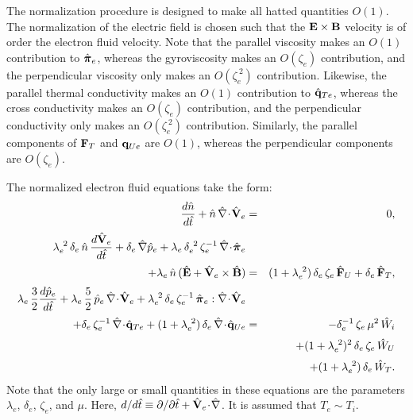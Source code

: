 The normalization procedure is designed to make all hatted quantities $O(1)$.
The normalization of the electric field is chosen 
 such that the ${\bf E}\times{\bf B}$
velocity is of order the electron fluid velocity. Note that the parallel viscosity
makes an $O(1)$ contribution to $\hat{\mbox{\boldmath$\pi$}}_e$, whereas the gyroviscosity
makes an $O(\zeta_e)$ contribution, and the perpendicular viscosity only 
makes an $O(\zeta_e^{~2})$ contribution. Likewise, the parallel thermal
conductivity 
makes an $O(1)$ contribution to $\hat{\bf q}_{Te}$, whereas the cross
conductivity 
makes an $O(\zeta_e)$ contribution, and the perpendicular conductivity only 
makes an $O(\zeta_e^{~2})$ contribution. Similarly, the parallel components
of ${\bf F}_T$ and ${\bf q}_{Ue}$ are $O(1)$, whereas the perpendicular
components are $O(\zeta_e)$. 

The normalized electron fluid equations take the form:
\begin{eqnarray}
\frac{d\hat{n}}{d\hat{t}} + \hat{n}\,\hat{\nabla}\!\cdot\!\hat{\bf V}_e &=&0,\label{e3.113a}\\[0.5ex]
\lambda_e^{~2}\,\delta_e\,\hat{n}\,\frac{d\hat{\bf V}_e}{d\hat{t}} + \delta_e\,
\hat{\nabla}\hat{p}_e + \lambda_e\,\delta_e^{~2}\,\zeta_e^{-1}\,\hat{\nabla}
\!\cdot\!\hat{\bpi}_e  \\[0.5ex]
+ \lambda_e\,\hat{n}\,(\hat{\bf E} + \hat{\bf V}_e
\times\hat{\bf B}) &=& (1+\lambda_e^{~2})\,\delta_e\,\zeta_e\,\hat{\bf F}_U + \delta_e
\,\hat{\bf F}_T, \nonumber\\[0.5ex]
\lambda_e\,\frac{3}{2}\frac{d\hat{p}_e}{d\hat{t}} + \lambda_e\,\frac{5}{2}\,
\hat{p}_e\,\hat{\nabla}\!\cdot\!\hat{\bf V}_e + \lambda_e^{~2}\,\delta_e\,
\zeta_e^{-1}\,\hat{\bpi}_e : \hat{\nabla}\!\cdot\!\hat{\bf V}_e&&\label{e3.113c}\\[0.5ex] 
+\delta_e\,\zeta_e^{-1} \,\hat{\nabla}\!\cdot\!\hat{\bf q}_{Te}
 +(1+\lambda_e^{~2})\,\delta_e\,\hat{\nabla}\!\cdot\!\hat{\bf q}_{Ue} 
&=& -\delta_e^{-1}\,\zeta_e\,\mu^2\,\hat{W}_i \nonumber\\[0.5ex]
&&+ (1+\lambda_e^{~2})^2\,\delta_e\,\zeta_e\,
\hat{W}_U \nonumber\\[0.5ex]&& + (1+\lambda_e^{~2})\,\delta_e\,\hat{W}_T.\nonumber
\end{eqnarray}
Note that the only large or small quantities in these equations are the
parameters $\lambda_e$, $\delta_e$, $\zeta_e$, and $\mu$. 
Here, $d/d\hat{t}\equiv\partial /\partial\hat{t} +
 \hat{\bf V}_e\!\cdot\!\hat{\nabla}$. It is assumed that $T_e\sim T_i$.



